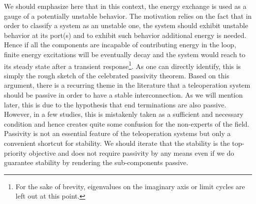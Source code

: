 \begin{rem} We should emphasize here that in this context, the energy exchange is used as a gauge of a potentially unstable behavior. 
The motivation relies on the fact that in order to classify a system as an unstable one, the system should exhibit unstable
behavior at its port(s) and to exhibit such behavior additional energy is needed. Hence if all the components are incapable
of contributing energy in the loop, finite energy excitations will be eventually decay and the system would reach to its steady state
after a transient response\footnote{For the sake of brevity, eigenvalues on the imaginary axis or limit cycles are left out at this point.}. 
As one can directly identify, this is simply the rough sketch of the celebrated passivity theorem. Based 
on this argument, there is a recurring theme in the literature that a teleoperation system should be passive in order to have a stable 
interconnection. As we will mention later, this is due to the hypothesis that end terminations are also passive. However, in a few 
studies, this is mistakenly taken as a sufficient and necessary condition and hence creates quite some confusion for the non-experts 
of the field. Passivity is not an essential feature of the teleoperation systems but only a convenient shortcut for stability. We should 
iterate that the stability is the top-priority objective and does not require passivity by any means even if we do guarantee stability 
by rendering the sub-components passive. 
\end{rem}

